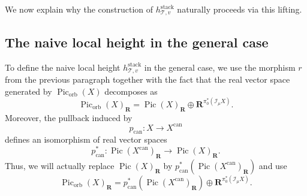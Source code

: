 \documentclass{proc-l}
\newcommand{\R}{\mathbf{R}}
\newcommand{\Z}{\mathbf{Z}}
\newcommand{\Q}{\mathbf{Q}}
\DeclareMathOperator{\Pic}{Pic}
\DeclareMathOperator{\can}{can}
\DeclareMathOperator{\stack}{stack}
\DeclareMathOperator{\age}{age}
\DeclareMathOperator{\orb}{orb}
\DeclareMathOperator{\ext}{ext}
\newcommand{\stackT}{\mathcal{T}}
\newcommand{\sheafI}{\mathcal{I}}
\newcommand{\twistsector}{\pi_0^*(\sheafI_{\mu} X)}
\newtheorem{lemma}[theorem]{Lemma}
\theoremstyle{definition}
\theoremstyle{remark}
\numberwithin{equation}{section}
\begin{document}
%
%
%

We now explain why the construction of $h_{\stackT,v}^{\stack}$ naturally proceeds via
this lifting.




\subsection{The naive local height in the general case}




To define the naive local height $h_{\stackT,v}^{\stack}$ in the general case, we use the morphism $r$ from the previous
paragraph together with the fact that the real vector space generated by
$\Pic_{\orb}(X)$ decomposes as
\[
\Pic_{\orb}(X)_{\R}
=
\Pic(X)_{\R} \oplus \R^{\twistsector}.
\]
Moreover, the pullback induced by
\[
p_{\can} : X \longrightarrow X^{\can}
\]
defines an isomorphism of real vector spaces
\[
p_{\can}^{*} : \Pic(X^{\can})_{\R} \longrightarrow \Pic(X)_{\R}.
\]Thus, we will actually replace $\Pic(X)_{\R}$ by
$p_{\can}^{*}\!\left(\Pic(X^{\can})_{\R}\right)$ and use $$\Pic_{\orb}(X)_{\R}
=
p_{\can}^{*}\!\left(\Pic(X^{\can})_{\R}\right) \oplus \R^{\twistsector} .$$
\end{document}

